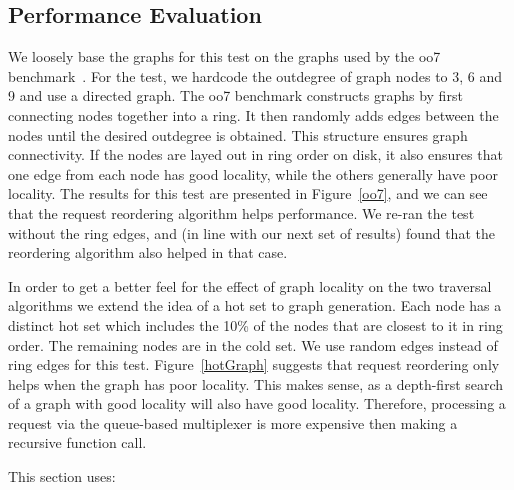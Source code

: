\documentclass[letterpaper,twocolumn,english]{article}
\newcommand{\yad}{Lemon\xspace}
\begin{document}

\subsection {Performance Evaluation}

We loosely base the graphs for this test on the graphs used by the oo7
benchmark~\cite{oo7}.  For the test, we hardcode the outdegree of
graph nodes to 3, 6 and 9 and use a directed graph.  The oo7 benchmark
constructs graphs by first connecting nodes together into a ring.  It
then randomly adds edges between the nodes until the desired outdegree
is obtained.  This structure ensures graph connectivity.  If the nodes
are layed out in ring order on disk, it also ensures that one edge
from each node has good locality, while the others generally have poor
locality.  The results for this test are presented in
Figure~\ref{oo7}, and we can see that the request reordering algorithm
helps performance.  We re-ran the test without the ring edges, and (in
line with our next set of results) found that the reordering algorithm
also helped in that case.

In order to get a better feel for the effect of graph locality on the
two traversal algorithms we extend the idea of a hot set to graph
generation.  Each node has a distinct hot set which includes the 10\%
of the nodes that are closest to it in ring order.  The remaining
nodes are in the cold set.  We use random edges instead of ring edges
for this test.  Figure~\ref{hotGraph} suggests that request reordering 
only helps when the graph has poor locality.  This makes sense, as a 
depth-first search of a graph with good locality will also have good 
locality.  Therefore, processing a request via the queue-based multiplexer 
is more expensive then making a recursive function call.

This section uses:
\end{document}
